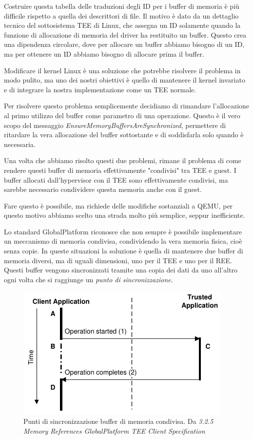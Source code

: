 \documentclass[12pt,italian]{report}
\begin{document}
Costruire questa tabella delle traduzioni degli ID per i buffer di memoria è
più difficile rispetto a quella dei descrittori di file.
Il motivo è dato da un dettaglio tecnico del sottosistema TEE di Linux, che
assegna un ID solamente quando la funzione di allocazione di memoria del driver
ha restituito un buffer.
Questo crea una dipendenza circolare, dove per allocare un buffer
abbiamo bisogno di un ID, ma per ottenere un ID abbiamo bisogno di
allocare prima il buffer.

Modificare il kernel Linux è una soluzione che potrebbe risolvere il problema
in modo pulito, ma uno dei nostri obiettivi è quello di mantenere il kernel
invariato e di integrare la nostra implementazione come un TEE normale. 

Per risolvere questo problema semplicemente decidiamo di rimandare
l'allocazione
al primo utilizzo del buffer come parametro di una operazione.
Questo è il vero scopo del messaggio
\textit{EnsureMemoryBuffersAreSynchronized},
permettere di ritardare la vera allocazione del buffer sottostante e
di soddisfarla solo quando è necessaria.

\bigbreak \noindent

Una volta che abbiamo risolto questi due problemi, rimane il problema di
come rendere questi buffer di memoria effettivamente "condivisi" tra TEE
e guest.
I buffer allocati dall'hypervisor con il TEE sono effettivamente condivisi,
ma sarebbe necessario condividere questa memoria anche con il guest.

Fare questo è possibile, ma richiede delle modifiche sostanziali a QEMU, per
questo motivo abbiamo scelto una strada molto più semplice, seppur
inefficiente.

Lo standard GlobalPlatform riconosce che non sempre è possibile implementare
un  meccanismo di memoria condivisa, condividendo la vera memoria fisica,
cioè senza copie.
In queste situazioni la soluzione è quella di mantenere due buffer di memoria
diversi, ma di uguali dimensioni, uno per il TEE e uno per il REE.
Questi buffer vengono sincronizzati tramite una copia dei dati da uno all'altro
ogni volta che si raggiunge un \textit{punto di sincronizzazione}.

\begin{figure}[h]
    \centering
    \includegraphics{immagini/tp-synchronization-points}
    \caption{
        Punti di sincronizzazione buffer di memoria condivisa.
        Da \textit{
            3.2.5 Memory References GlobalPlatform TEE Client Specification
        }
    }
    \label{fig:gp-punti-sincronizzazione}
\end{figure}
\end{document}
